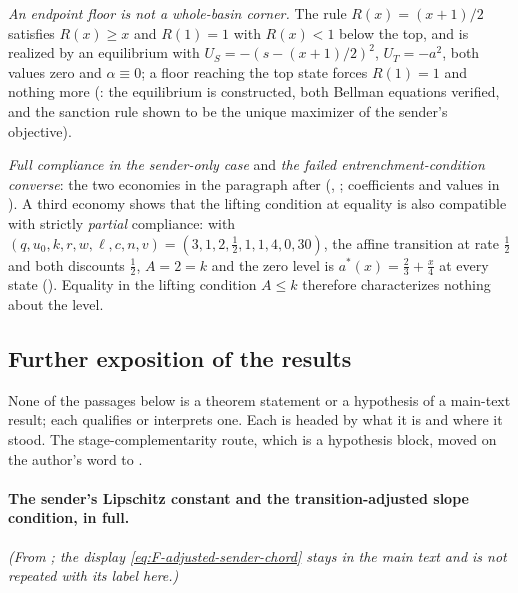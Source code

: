 \emph{An endpoint floor is not a whole-basin corner.} The rule $R(x)=(x+1)/2$
satisfies $R(x)\ge x$ and $R(1)=1$ with $R(x)<1$ below the top, and is realized
by an equilibrium with $U_S=-(s-(x+1)/2)^2$, $U_T=-a^2$, both values zero and
$\alpha\equiv0$; a floor reaching the top state forces $R(1)=1$ and nothing more
(: the equilibrium is constructed,
both Bellman equations verified, and the sanction rule shown to be the unique
maximizer of the sender's objective).

\emph{Full compliance in the sender-only case} and \emph{the failed
entrenchment-condition converse}: the two economies in the paragraph after
 (,
; coefficients and values in
). A third economy shows that the lifting condition at equality
is also compatible with strictly \emph{partial} compliance: with
$(q,u_0,k,r,w,\ell,c,n,v)=(3,1,2,\tfrac12,1,1,4,0,30)$, the affine transition at
rate $\tfrac12$ and both discounts $\tfrac12$, $A=2=k$ and the zero level is
$a^\ast(x)=\tfrac23+\tfrac x4$ at every state
(). Equality in
the lifting condition $A\le k$ therefore characterizes nothing about the level.

\subsection{Further exposition of the results}
\label{app:moved-ah}

None of the passages below is a theorem
statement or a hypothesis of a main-text result; each qualifies or
interprets one. Each is headed by what it is and where it stood. The
stage-complementarity route, which is a hypothesis block, moved on the
author's word to .

\paragraph{The sender's Lipschitz constant and the transition-adjusted slope condition, in full.} \emph{(From ; the display \eqref{eq:F-adjusted-sender-chord} stays in the main text and is not repeated with its label here.)}

